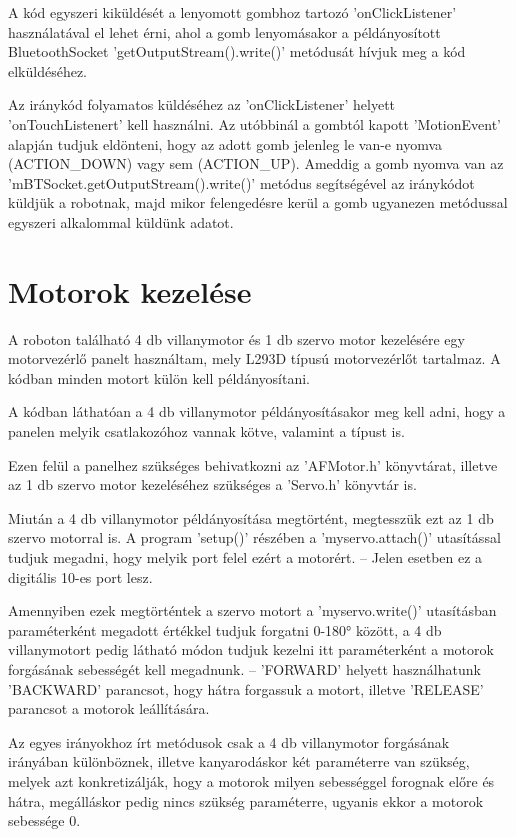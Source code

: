 \documentclass[]{thesis-ekf}
\theoremstyle{definition}
\begin{document}
A kód egyszeri kiküldését a lenyomott gombhoz tartozó 'onClickListener' használatával el lehet érni, ahol a gomb lenyomásakor a példányosított BluetoothSocket 'getOutputStream().write()' metódusát hívjuk meg a kód elküldéséhez.

Az iránykód folyamatos küldéséhez az 'onClickListener' helyett 'onTouchListenert' kell használni. Az utóbbinál a gombtól kapott 'MotionEvent' alapján tudjuk eldönteni, hogy az adott gomb jelenleg le van-e nyomva (ACTION\_DOWN) vagy sem (ACTION\_UP). Ameddig a gomb nyomva van az 'mBTSocket.getOutputStream().write()' metódus segítségével az iránykódot küldjük a robotnak, majd mikor felengedésre kerül a gomb ugyanezen metódussal egyszeri alkalommal küldünk adatot.

\section{Motorok kezelése}
A roboton található 4 db villanymotor és 1 db szervo motor kezelésére egy motorvezérlő panelt használtam, mely L293D típusú motorvezérlőt tartalmaz. A kódban minden motort külön kell példányosítani.


A kódban láthatóan a 4 db villanymotor példányosításakor meg kell adni, hogy a panelen melyik csatlakozóhoz vannak kötve, valamint a típust is.

Ezen felül a panelhez szükséges behivatkozni az 'AFMotor.h' könyvtárat, illetve az 1 db szervo motor kezeléséhez szükséges a 'Servo.h' könyvtár is.

Miután a 4 db villanymotor példányosítása megtörtént, megtesszük ezt az 1 db szervo motorral is. A program 'setup()' részében a 'myservo.attach()' utasítással tudjuk megadni, hogy melyik port felel ezért a motorért. -- Jelen esetben ez a digitális 10-es port lesz.

Amennyiben ezek megtörténtek a szervo motort a 'myservo.write()' utasításban paraméterként megadott értékkel tudjuk forgatni 0-180° között, a 4 db villanymotort pedig  látható módon tudjuk kezelni itt paraméterként a motorok forgásának sebességét kell megadnunk. -- 'FORWARD' helyett használhatunk 'BACKWARD' parancsot, hogy hátra forgassuk a motort, illetve 'RELEASE' parancsot a motorok leállítására. 

Az egyes irányokhoz írt metódusok csak a 4 db villanymotor forgásának irányában különböznek, illetve kanyarodáskor két paraméterre van szükség, melyek azt konkretizálják, hogy a motorok milyen sebességgel forognak előre és hátra, megálláskor pedig nincs szükség paraméterre, ugyanis ekkor a motorok sebessége 0.

\end{document}

